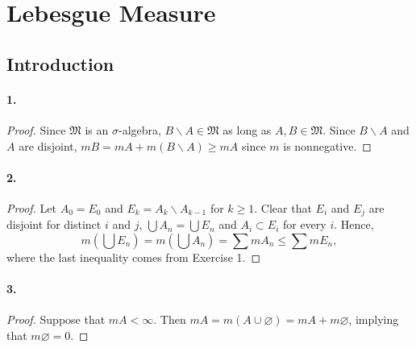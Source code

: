 \section{Lebesgue Measure}
\subsection{Introduction}
  \paragraph{1.}
  \begin{proof}
    Since $\mathfrak{M}$ is an $\sigma$-algebra, $B\backslash A \in\mathfrak{M}$
    as long as $A,B\in\mathfrak{M}$. Since $B\backslash A$ and $A$ are disjoint,
    $mB=mA+m(B\backslash A)\ge mA$ since $m$ is nonnegative.
  \end{proof}

  \paragraph{2.}
  \begin{proof}
    Let $A_0 = E_0$ and $E_k=A_k\backslash A_{k-1}$ for $k\ge 1$. Clear that 
    $E_i$ and $E_j$ are disjoint for distinct $i$ and $j$, $\bigcup A_n=\bigcup
    E_n$ and $A_i\subset E_i$ for every $i$. Hence,
    \[
      m\left(\bigcup E_n\right) = m\left(\bigcup A_n\right)
      = \sum mA_n \le \sum mE_n,
    \]
    where the last inequality comes from Exercise 1.
  \end{proof}

  \paragraph{3.}
  \begin{proof}
    Suppose that $mA<\infty$. Then $mA=m(A\cup\varnothing)=mA+m\varnothing$, 
    implying that $m\varnothing=0$.
  \end{proof}

